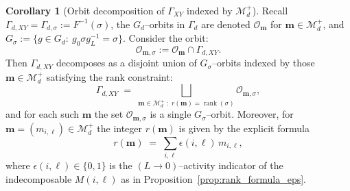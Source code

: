 \documentclass{article}
\newcommand{\rank}{\operatorname{rank}}
\theoremstyle{definition}
\newtheorem{corollary}[theorem]{Corollary}
\begin{document}
\begin{corollary}[Orbit decomposition of $\Gamma_{XY}$ indexed by $\mathcal M_d^+$]
\label{cor:GammaXY_decomposition_by_Mdplus}
Recall $\Gamma_{d,XY}=\Gamma_{d,\sigma}:=F^{-1}(\sigma)$,
the $G_d$--orbits in $\Gamma_d$ are denoted $\mathcal O_{\mathbf m}$ for $\mathbf m\in\mathcal M_d^+$,
and $G_\sigma:=\{g\in G_d:\ g_0\sigma g_L^{-1}=\sigma\}$. Consider the orbit:
\begin{equation*}
    \mathcal O_{\mathbf m, \sigma} := \mathcal O_{\mathbf m}\cap \Gamma_{d,XY}.
\end{equation*}
Then $\Gamma_{d,XY}$ decomposes as a disjoint union of $G_\sigma$--orbits indexed by those
$\mathbf m\in\mathcal M_d^+$ satisfying the rank constraint:
\[
\Gamma_{d,XY}
\;=\;
\bigsqcup_{\mathbf m\in\mathcal M_d^+\;:\; r(\mathbf m)=\rank(\sigma)}
 \mathcal O_{\mathbf m, \sigma},
\]
and for each such $\mathbf m$ the set $ \mathcal O_{\mathbf m, \sigma}$ is a single $G_\sigma$--orbit.
\noindent
Moreover, for $\mathbf m=(m_{i,\ell})\in\mathcal M_d^+$ the integer $r(\mathbf m)$ is given by the explicit formula
\[
r(\mathbf m)\;=\;\sum_{i,\ell}\epsilon(i,\ell)\,m_{i,\ell},
\]
where $\epsilon(i,\ell)\in\{0,1\}$ is the $(L\to 0)$--activity indicator of the indecomposable $M(i,\ell)$
as in Proposition~\ref{prop:rank_formula_eps}.
\end{corollary}
\end{document}
